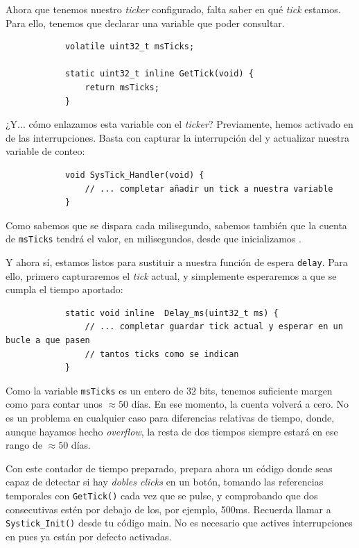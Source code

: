 \documentclass[../main.tex]{subfiles}
\begin{document}
        Ahora que tenemos nuestro \emph{ticker} configurado, falta saber en qué \emph{tick} estamos. Para ello, tenemos que declarar una variable que poder consultar. 

        \begin{lstlisting}
            volatile uint32_t msTicks;

            static uint32_t inline GetTick(void) {
                return msTicks;
            }
        \end{lstlisting}

        ¿Y... cómo enlazamos esta variable con el \emph{ticker}? Previamente, hemos activado en  de  las interrupciones. Basta con capturar la interrupción del  y actualizar nuestra variable de conteo:

        \begin{lstlisting}
            void SysTick_Handler(void) {
                // ... completar añadir un tick a nuestra variable
            }
        \end{lstlisting}

        Como sabemos que se dispara cada milisegundo, sabemos también que la cuenta de \texttt{msTicks} tendrá el valor, en milisegundos, desde que inicializamos .

        Y ahora sí, estamos listos para sustituir a nuestra función de espera \texttt{delay}. Para ello, primero capturaremos el \emph{tick} actual, y simplemente esperaremos a que se cumpla el tiempo aportado:

        \begin{lstlisting}
            static void inline  Delay_ms(uint32_t ms) {
                // ... completar guardar tick actual y esperar en un bucle a que pasen 
                // tantos ticks como se indican
            }
        \end{lstlisting}

        Como la variable \texttt{msTicks} es un entero de 32 bits, tenemos suficiente margen como para contar unos $\approx50$ días. En ese momento, la cuenta volverá a cero. No es un problema en cualquier caso para diferencias relativas de tiempo, donde, aunque hayamos hecho \emph{overflow}, la resta de dos tiempos siempre estará en ese rango de $\approx50$ días.
        
        Con este contador de tiempo preparado, prepara ahora un código donde seas capaz de detectar si hay \emph{dobles clicks} en un botón, tomando las referencias temporales con \texttt{GetTick()} cada vez que se pulse, y comprobando que dos consecutivas estén por debajo de los, por ejemplo, 500ms. Recuerda llamar a \texttt{Systick\_Init()} desde tu código main. No es necesario que actives interrupciones en  pues ya están por defecto activadas.
\end{document}
